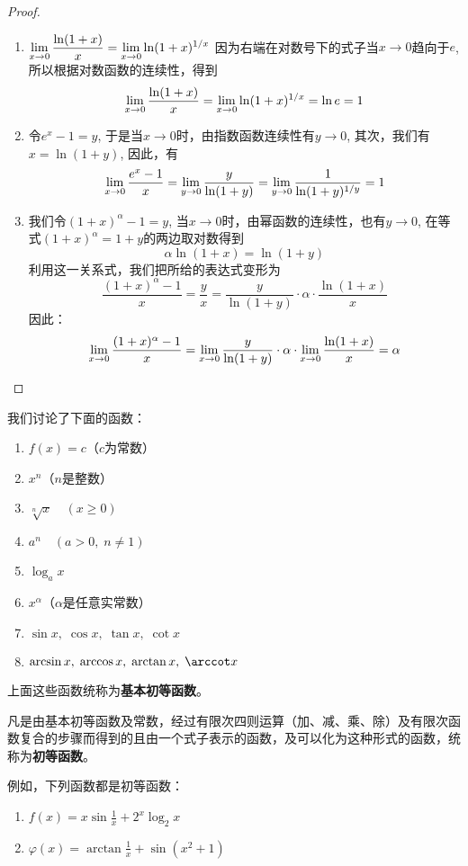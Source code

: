\begin{proof}
\begin{enumerate}
    \item $\displaystyle\lim_{x\to 0} \dfrac{\ln(1+x)}{x}=\displaystyle\lim_{x\to 0} \ln(1+x)^{1/x}$
    因为右端在对数号下的式子当$x\to 0$趋向于$e$, 所以根据对数函数的连续性，得到
\[\displaystyle\lim_{x\to 0} \dfrac{\ln(1+x)}{x}=\displaystyle\lim_{x\to 0} \ln(1+x)^{1/x}=\ln e=1\]
\item 令$e^x-1=y$, 于是当$x\to 0$时，由指数函数连续性有$y\to 0$, 其次，我们有$x=\ln(1+y)$, 因此，有
\[\displaystyle\lim_{x\to 0}\dfrac{e^x-1}{x}=\displaystyle\lim_{y\to 0}\dfrac{y}{\ln(1+y)}=\displaystyle\lim_{y\to 0}\dfrac{1}{\ln(1+y)^{1/y}}=1\]
\item 我们令$(1+x)^{\alpha}-1=y$, 当$x\to 0$时，由幂函数的连续性，也有$y\to 0$, 在等式$(1+x)^{\alpha}=1+y$的两边取对数得到
\[\alpha\ln (1+x) =\ln (1+y) \]
利用这一关系式，我们把所给的表达式变形为
\[\frac{(1+x)^\alpha-1}{x}=\frac{y}{x}=\frac{y}{\ln(1+y)}\cdot \alpha\cdot\frac{\ln(1+x)}{x}\]
因此：
\[\displaystyle\lim_{x\to 0} \dfrac{(1+x)^\alpha-1}{x}=   \displaystyle\lim_{x\to 0} \dfrac{y}{\ln(1+y)}\cdot \alpha\cdot   \displaystyle\lim_{x\to 0}  \dfrac{\ln(1+x)}{x}=\alpha\]
\end{enumerate}
\end{proof}

我们讨论了下面的函数：
\begin{enumerate}
    \item $f(x)=c$\quad （$c$为常数）
    \item $x^n$\quad（$n$是整数）
    \item $\sqrt[n]{x}\quad (x\ge 0)$
    \item $a^n\quad (a>0,\; n\ne 1)$
    \item $\log_a x$
    \item $x^\alpha$\quad （$\alpha$是任意实常数）
    \item $\sin x,\; \cos x, \; \tan x,\; \cot x$
    \item $\arcsin x,\; \arccos x, \; \arctan x,\; \arccot x$
\end{enumerate}
上面这些函数统称为\textbf{基本初等函数}。

凡是由基本初等函数及常数，经过有限次四则运算（加、减、乘、除）及有限次函数复合的步骤而得到的且由一个式子表示的函数，及可以化为这种形式的函数，统称为\textbf{初等函数}。

例如，下列函数都是初等函数：
\begin{enumerate}
    \item $f(x)=x\sin\frac{1}{x}+2^x\log_2 x$
    \item $\varphi(x)=\arctan\frac{1}{x}+\sin(x^2+1)$
\end{enumerate}

